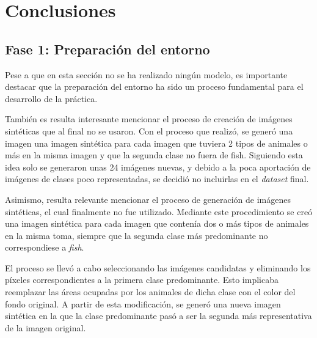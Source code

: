 \section{Conclusiones}

\noindent


\subsection{Fase 1: Preparación del entorno}

\quad

\noindent
Pese a que en esta sección no se ha realizado ningún modelo, 
es importante destacar que la preparación del entorno ha sido un 
proceso fundamental para el desarrollo de la práctica.

\quad

\noindent
También es resulta interesante mencionar el proceso de creación de imágenes sintéticas que al final no se 
usaron. Con el proceso que realizó, se generó una imagen una imagen sintética para cada
imagen que tuviera 2 tipos de animales o más en la misma imagen y que la segunda clase no fuera de fish.
Siguiendo esta idea solo se generaron unas 24 imágenes nuevas, y debido a la poca aportación de imágenes de clases poco 
representadas, se decidió no incluirlas en el \textit{dataset} final. 

\quad

\noindent
Asimismo, resulta relevante mencionar el proceso de generación de imágenes sintéticas, 
el cual finalmente no fue utilizado. Mediante este procedimiento se creó una imagen 
sintética para cada imagen que contenía dos o más tipos de animales en la misma toma, 
siempre que la segunda clase más predominante no correspondiese a \textit{fish}. 

\quad

\noindent
El proceso se llevó a cabo seleccionando las imágenes candidatas y eliminando los 
píxeles correspondientes a la primera clase predominante. Esto implicaba reemplazar 
las áreas ocupadas por los animales de dicha clase con el color del fondo original. 
A partir de esta modificación, se generó una nueva imagen sintética en la que la clase 
predominante pasó a ser la segunda más representativa de la imagen original.

\quad

